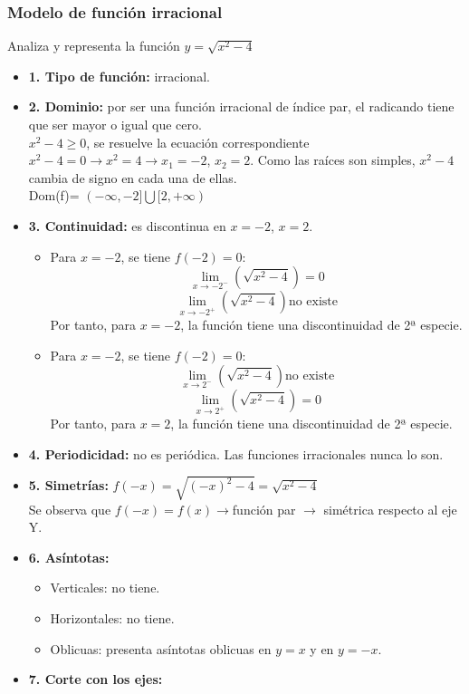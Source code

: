 \subsubsection{Modelo de función irracional}
Analiza y representa la función $y=\sqrt{x^2-4}$
\begin{itemize}
	\item \textbf{1. Tipo de función: }irracional.
	\item \textbf{2. Dominio: }por ser una función irracional de índice par, el radicando tiene que ser mayor o igual que cero.\\
	$x^2-4 \geq 0$, se resuelve la ecuación correspondiente $x^2-4=0 \rightarrow x^2=4 \rightarrow x_1=-2$, $x_2=2$. Como las raíces son simples, $x^2-4$ cambia de signo en cada una de ellas.\\
	Dom(f)= $(-\infty, -2] \bigcup [2, +\infty)$
	\item \textbf{3. Continuidad: }es discontinua en $x=-2$, $x=2$.
	\begin{itemize}
		\item Para $x=-2$, se tiene $f(-2)=0$:
		$$\lim_{x \to -2^{-}}(\sqrt{x^2-4})=0$$
		$$\lim_{x \to -2^{+}}(\sqrt{x^2-4}) \text{no existe}$$
		Por tanto, para $x=-2$, la función tiene una discontinuidad de 2ª especie.\\
		\item Para $x=-2$, se tiene $f(-2)=0$:
		$$\lim_{x \to 2^{-}}(\sqrt{x^2-4}) \text{no existe}$$
		$$\lim_{x \to 2^{+}}(\sqrt{x^2-4})=0$$
		Por tanto, para $x=2$, la función tiene una discontinuidad de 2ª especie.\\
	\end{itemize}
	\item \textbf{4. Periodicidad: }no es periódica. Las funciones irracionales nunca lo son.
	\item \textbf{5. Simetrías: }$f(-x) = \sqrt{(-x)^2-4} = \sqrt{x^2-4}$\\
	Se observa que $f(-x)=f(x) \rightarrow $función par $\rightarrow$ simétrica respecto al eje Y.
	\item \textbf{6. Asíntotas: }
	\begin{itemize}
		\item Verticales: no tiene.
		\item Horizontales: no tiene.
		\item Oblicuas: presenta asíntotas oblicuas en $y=x$ y en $y=-x$.
	\end{itemize}
	\item \textbf{7. Corte con los ejes: }

\end{itemize}
